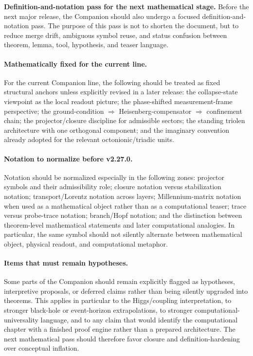 \noindent\textbf{Definition-and-notation pass for the next mathematical stage.} Before the next major release, the Companion should also undergo a focused definition-and-notation pass. The purpose of this pass is not to shorten the document, but to reduce merge drift, ambiguous symbol reuse, and status confusion between theorem, lemma, tool, hypothesis, and teaser language.

\paragraph{Mathematically fixed for the current line.}
For the current Companion line, the following should be treated as fixed structural anchors unless explicitly revised in a later release: the collapse-state viewpoint as the local readout picture; the phase-shifted measurement-frame perspective; the ground-condition $\Rightarrow$ Heisenberg-compensator $\Rightarrow$ confinement chain; the projector/closure discipline for admissible sectors; the standing triolen architecture with one orthogonal component; and the imaginary convention already adopted for the relevant octonionic/triadic units.

\paragraph{Notation to normalize before v2.27.0.}
Notation should be normalized especially in the following zones: projector symbols and their admissibility role; closure notation versus stabilization notation; transport/Lorentz notation across layers; Millennium-matrix notation when used as a mathematical object rather than as a computational teaser; trace versus probe-trace notation; branch/Hopf notation; and the distinction between theorem-level mathematical statements and later computational analogies. In particular, the same symbol should not silently alternate between mathematical object, physical readout, and computational metaphor.

\paragraph{Items that must remain hypotheses.}
Some parts of the Companion should remain explicitly flagged as hypotheses, interpretive proposals, or deferred claims rather than being silently upgraded into theorems. This applies in particular to the Higgs/coupling interpretation, to stronger black-hole or event-horizon extrapolations, to stronger computational-universality language, and to any claim that would identify the computational chapter with a finished proof engine rather than a prepared architecture. The next mathematical pass should therefore favor closure and definition-hardening over conceptual inflation.

